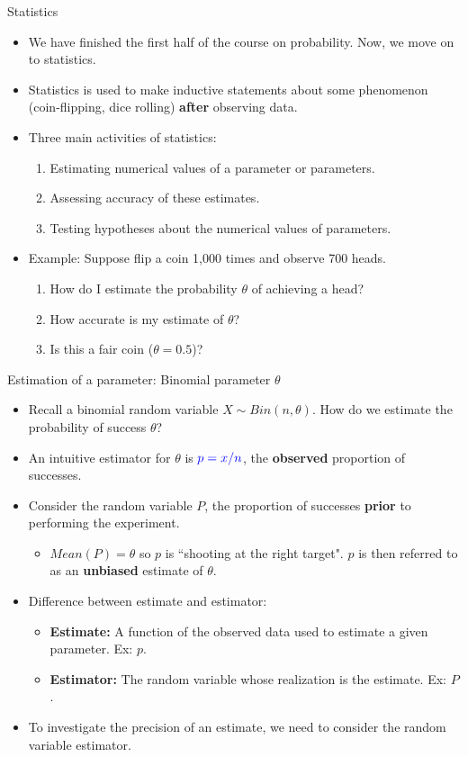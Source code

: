 \documentclass[10pt, xcolor=table]{beamer}
\begin{document}
\begin{frame}{Statistics}
\begin{itemize}\itemsep3ex
\item<1-> We have finished the first half of the course on {\color{blue} probability}. Now, we move on to {\color{blue} statistics}.
\item<2-> {\color{blue} Statistics} is used to make inductive statements about some phenomenon (coin-flipping, dice rolling) \textbf{after} observing data.
\item<3-> Three main activities of statistics:
\begin{enumerate}\itemsep1ex
\item Estimating numerical values of a parameter or parameters.
\item Assessing accuracy of these estimates.
\item Testing hypotheses about the numerical values of parameters.
\end{enumerate}
\item<4-> Example: Suppose flip a coin 1,000 times and observe 700 heads.
\begin{enumerate}\itemsep1ex
\item How do I estimate the probability $\theta$ of achieving a head?
\item How accurate is my estimate of $\theta$?
\item Is this a fair coin ($\theta = 0.5$)?
\end{enumerate}
\end{itemize}
\end{frame}

\begin{frame}{Estimation of a parameter: Binomial parameter $\theta$}
\begin{itemize}\itemsep3ex
\item<1-> Recall a binomial random variable $X \sim Bin(n, \theta)$. How do we estimate the probability of success $\theta$?
\item<2-> An intuitive estimator for $\theta$ is $\color{blue} p = x/n$, the \textbf{observed} proportion of successes.
\item<3-> Consider the random variable $P$, the proportion of successes \textbf{prior} to performing the experiment. 
\begin{itemize}
\item<4-> $Mean(P) = \theta$ so $p$ is ``shooting at the right target". $p$ is then referred to as an \textbf{unbiased} estimate of $\theta$.
\end{itemize}
\item<5-> Difference between estimate and estimator:
\begin{itemize}
\item \textbf{Estimate:} A function of the observed data used to estimate a given parameter. Ex: $p$.
\item \textbf{Estimator:} The random variable whose realization is the estimate. Ex: $P$.
\end{itemize}
\item<6-> To investigate the precision of an estimate, we need to consider the random variable estimator.
\end{itemize}
\end{frame}
\end{document}
